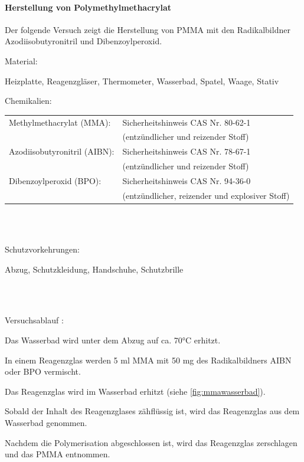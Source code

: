 \paragraph{Herstellung von Polymethylmethacrylat}

Der folgende Versuch zeigt die Herstellung von PMMA mit den Radikalbildner
Azodiisobutyronitril und Dibenzoylperoxid. \\

\par

Material:
\begin{compactitem}
    \item Heizplatte, Reagenzgläser, Thermometer, Wasserbad, Spatel, Waage, Stativ
    \item Chemikalien: \\[5pt]
    \begin{tabular}{ll}
    Methylmethacrylat (MMA): & Sicherheitshinweis CAS Nr. 80-62-1 \\
    & (entzündlicher und reizender Stoff) \\
    Azodiisobutyronitril (AIBN): & Sicherheitshinweis CAS Nr. 78-67-1 \\
    & (entzündlicher und reizender Stoff) \\
    Dibenzoylperoxid (BPO): & Sicherheitshinweis CAS Nr. 94-36-0 \\
    & (entzündlicher, reizender und explosiver Stoff)
    \end{tabular}
\end{compactitem}~\par

\\Schutzvorkehrungen:
\begin{compactitem}
    \item Abzug, Schutzkleidung, Handschuhe, Schutzbrille
\end{compactitem}~\par

\\Versuchsablauf \cite{pofversuch}:
\begin{compactenum}
    \item Das Wasserbad wird unter dem Abzug auf ca. 70°C erhitzt.
    \item In einem Reagenzglas werden 5 ml MMA mit 50 mg des Radikalbildners AIBN oder BPO vermischt.
    \item Das Reagenzglas wird im Wasserbad erhitzt (siehe \autoref{fig:mmawasserbad}).
    \item Sobald der Inhalt des Reagenzglases zähflüssig ist, wird das Reagenzglas aus dem Wasserbad genommen.
    \item Nachdem die Polymerisation abgeschlossen ist, wird das Reagenzglas zerschlagen und das PMMA entnommen.
\end{compactenum}


